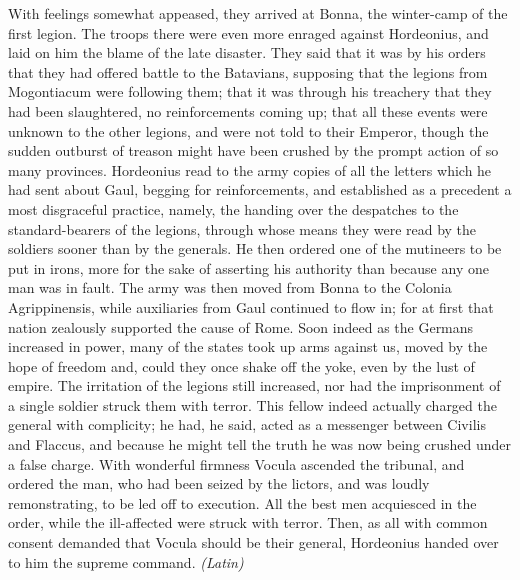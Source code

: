 With feelings somewhat appeased, they arrived at Bonna, the winter-camp of the first legion. The troops there were even more enraged against Hordeonius, and laid on him the blame of the late disaster. They said that it was by his orders that they had offered battle to the Batavians, supposing that the legions from Mogontiacum were following them; that it was through his treachery that they had been slaughtered, no reinforcements coming up; that all these events were unknown to the other legions, and were not told to their Emperor, though the sudden outburst of treason might have been crushed by the prompt action of so many provinces. Hordeonius read to the army copies of all the letters which he had sent about Gaul, begging for reinforcements, and established as a precedent a most disgraceful practice, namely, the handing over the despatches to the standard-bearers of the legions, through whose means they were read by the soldiers sooner than by the generals. He then ordered one of the mutineers to be put in irons, more for the sake of asserting his authority than because any one man was in fault. The army was then moved from Bonna to the Colonia Agrippinensis, while auxiliaries from Gaul continued to flow in; for at first that nation zealously supported the cause of Rome. Soon indeed as the Germans increased in power, many of the states took up arms against us, moved by the hope of freedom and, could they once shake off the yoke, even by the lust of empire. The irritation of the legions still increased, nor had the imprisonment of a single soldier struck them with terror. This fellow indeed actually charged the general with complicity; he had, he said, acted as a messenger between Civilis and Flaccus, and because he might tell the truth he was now being crushed under a false charge. With wonderful firmness Vocula ascended the tribunal, and ordered the man, who had been seized by the lictors, and was loudly remonstrating, to be led off to execution. All the best men acquiesced in the order, while the ill-affected were struck with terror. Then, as all with common consent demanded that Vocula should be their general, Hordeonius handed over to him the supreme command. \emph{(Latin)}



